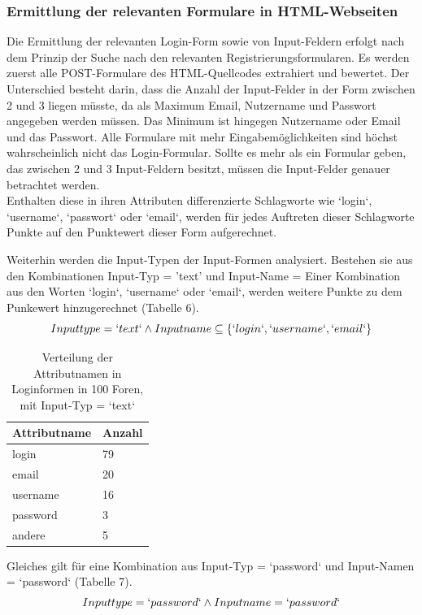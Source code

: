 \subsubsection{Ermittlung der relevanten Formulare in HTML-Webseiten}
Die Ermittlung der relevanten Login-Form sowie von Input-Feldern erfolgt nach dem Prinzip der Suche nach den relevanten Registrierungsformularen. Es werden zuerst alle POST-Formulare des HTML-Quellcodes extrahiert und bewertet. Der Unterschied besteht darin, dass die Anzahl der Input-Felder in der Form zwischen 2 und 3 liegen müsste, da als Maximum Email, Nutzername und Passwort angegeben werden müssen. Das Minimum ist hingegen Nutzername oder Email und das Passwort. Alle Formulare mit mehr Eingabemöglichkeiten sind höchst wahrscheinlich nicht das Login-Formular.
Sollte es mehr als ein Formular geben, das zwischen 2 und 3 Input-Feldern besitzt, müssen die Input-Felder genauer betrachtet werden. \\
Enthalten diese in ihren Attributen differenzierte Schlagworte wie `login`, `username`, `passwort` oder `email`, werden für jedes Auftreten dieser Schlagworte Punkte auf den Punktewert dieser Form aufgerechnet.


Weiterhin werden die Input-Typen der Input-Formen analysiert. Bestehen sie aus den Kombinationen Input-Typ = 'text' und Input-Name = Einer Kombination aus den Worten `login`, `username` oder `email`, werden weitere Punkte zu dem Punkewert hinzugerechnet (Tabelle 6).
\[Inputtype = `text` \wedge Inputname \subseteq \{`login`,`username`,`email`\}\]

\begin{table}[h!]
\centering 
\begin{tabular}{ | p{3cm} | p{3cm}|} \hline
\textbf{Attributname} & \textbf{Anzahl} \\ \hline
login & 79 \\ \hline
email & 20 \\ \hline
username & 16 \\ \hline
password & 3 \\ \hline
andere & 5 \\ \hline
\end{tabular}
\caption{Verteilung der Attributnamen in Loginformen in 100 Foren, mit Input-Typ = `text`}
\end{table}



Gleiches gilt für eine Kombination aus Input-Typ = `password` und Input-Namen = `password` (Tabelle 7).
\[Inputtype = `password` \wedge Inputname = `password`\]

